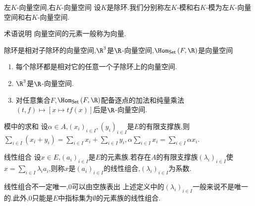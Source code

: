 \begin{definition}{左$K$-向量空间,右$K$-向量空间}{}
	设$K$是除环.我们分别称左$K$-模和右$K$-模为左$K$-向量空间和右$K$-向量空间.
\end{definition}

\begin{remark}{术语说明}{}
	向量空间的元素一般称为向量.
\end{remark}

\begin{example}{除环是相对子除环的向量空间,$\R^{3}$是$\R$-向量空间,$\Hom_{\mathsf{Set}}\left(F,\R\right)$是向量空间}{}
	\begin{enumerate}
		\item 每个除环都是相对它的任意一个子除环上的向量空间.
		\item $\R^{3}$是$\R$-向量空间.
		\item 对任意集合$F$,$\Hom_{\mathsf{Set}}\left(F,\R\right)$配备逐点的加法和纯量乘法$\left(t,f\right)\mapsto\left[x\mapsto tf\left(x\right)\right]$后是$\R$-向量空间.
	\end{enumerate}
\end{example}

\begin{proposition}{模中的求和}{}
	设$\alpha\in A$,$\left(x_{i}\right)_{i\in I},\left(y_{i}\right)_{i\in I}$是$E$的有限支撑族,则$\sum\limits_{i\in I}\left(x_{i}+y_{i}\right)=\sum\limits_{i\in I}x_{i}+\sum\limits_{i\in I}y_{i},\alpha\sum\limits_{i\in I}x_{i}=\sum\limits_{i\in I}\alpha x_{i}$.
\end{proposition}

\begin{definition}{线性组合}{}
	设$x\in E$,$\left(a_{i}\right)_{i\in I}$是$E$的元素族.若存在$A$的有限支撑族$\left(\lambda_{i}\right)_{i\in I}$使$x=\sum\limits_{i\in I}\lambda_{i}a_{i}$,则称$x$是$\left(a_{i}\right)_{i\in I}$的线性组合,$\left(\lambda_{i}\right)_{i\in I}$为系数.
\end{definition}

\begin{remark}{线性组合不一定唯一,$0$可以由空族表出}{}
	上述定义中的$\left(\lambda_{i}\right)_{i\in I}$一般来说不是唯一的.此外,$0$只能是$E$中指标集为$\emptyset$的元素族的线性组合.
\end{remark}



















































